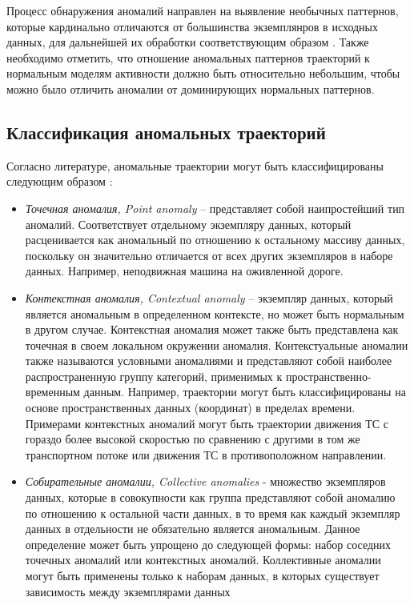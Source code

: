 Процесс обнаружения аномалий направлен на выявление необычных паттернов, которые кардинально отличаются от большинства экземплянров в исходных данных, для дальнейшей их обработки соответствующим образом \cite{article:11_eod_hdd}. Также необходимо отметить, что отношение аномальных паттернов траекторий к нормальным моделям активности должно быть относительно небольшим, чтобы можно было отличить аномалии от доминирующих нормальных паттернов.

\subsection{Классификация аномальных траекторий}

Согласно литературе, аномальные траектории могут быть классифицированы следующим образом \cite{article:15_survey_ad}\cite{article:6_survey_anom_det_rtuvs}\cite{article:comp_analys_odt}:
\begin{itemize}
	\item \textit{Точечная аномалия, Point anomaly} -- представляет собой наипростейший тип аномалий. Соответствует отдельному экземпляру данных, который расценивается как аномальный по отношению к остальному массиву данных, поскольку он значительно отличается от всех других экземпляров в наборе данных. Например, неподвижная машина на оживленной дороге.
	\item \textit{Контекстная аномалия, Contextual anomaly} -- экземпляр данных, который является аномальным в определенном контексте, но может быть нормальным в другом случае. Контекстная аномалия может также быть представлена как точечная в своем локальном окружении аномалия. Контекстуальные аномалии также называются условными аномалиями и представляют собой наиболее распространенную группу категорий, применимых к пространственно-временным данным. Например, траектории могут быть классифицированы на основе пространственных данных (координат) в пределах времени. Примерами контекстных аномалий могут быть траектории движения ТС с гораздо более высокой скоростью по сравнению с другими в том же транспортном потоке или движения ТС в противоположном направлении.
	\item \textit{Собирательные аномалии, Collective anomalies} - множество экземпляров данных, которые в совокупности как группа представляют собой аномалию по отношению к остальной части данных, в то время как каждый экземпляр данных в отдельности не обязательно является аномальным. Данное определение может быть упрощено до следующей формы: набор соседних точечных аномалий или контекстных аномалий. Коллективные аномалии могут быть применены только к наборам данных, в которых существует зависимость между экземплярами данных
\end{itemize}

